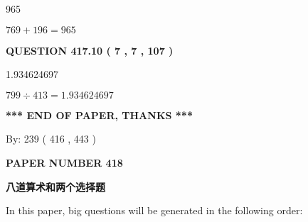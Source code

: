 \documentclass{ctexart}
\begin{document}
965
 
 
 
 
\noindent{}

$ %
769 +  %
196=   %
965$
 
 
  
\vspace{0.2in}
  
{\textbf{\Large{QUESTION
417.10 
 ( 7 , 7 , 107 )
}}}
  
  
 
 
\noindent{}

1.934624697
 
 
 
 
\noindent{}

$ %
799 \div  %
413=   %
1.934624697$
 
 
   
   
 \vspace{0.2in}
 
   
   
   
   
\vspace{1.0in} 
{\textbf{\large{ *** END OF PAPER, THANKS *** }}} 
   
   
\hspace{1.0in} By: 
 239 ( 416 ,  443 )
   
   
   
   
\newpage 
\setcounter{page}{ 
   418001 } 
   
   
   
   
 {\textbf{ \Large{ PAPER NUMBER  418  }}}
   
   
\vspace{0.2in}
   
   
   
   
   
   
 \vspace{0.2in}
{\LARGE {\textbf{ 八道算术和两个选择题}}}
   
   
   
\vspace{0.2in}
   
In this paper, big questions will be generated in the following order: 
   
\end{document}
